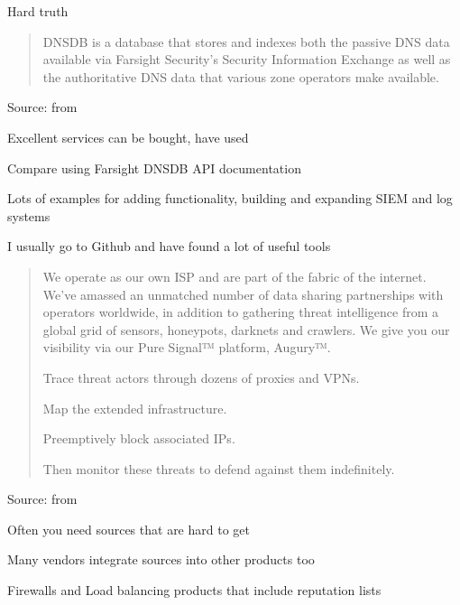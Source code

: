 \documentclass[Screen16to9,17pt]{foils}
\begin{document}
\begin{list2}
  \item Hard truth
\end{list2}



\begin{quote}
DNSDB is a database that stores and indexes both the passive DNS data available via Farsight Security’s Security Information Exchange as well as the authoritative DNS data that various zone operators make available.
\end{quote}
Source: from 
\begin{list2}
  \item Excellent services can be bought, have used 
\item Compare using 
  Farsight DNSDB API documentation
\item Lots of examples for adding functionality, building and expanding SIEM and log systems
\item I usually go to Github and have found a lot of useful tools
\end{list2}



\begin{quote}
  We operate as our own ISP and are part of the fabric of the internet. We’ve amassed an unmatched number of data sharing partnerships with operators worldwide, in addition to gathering threat intelligence from a global grid of sensors, honeypots, darknets and crawlers. We give you our visibility via our Pure Signal™ platform, Augury™.

\begin{list2}
\item Trace threat actors through dozens of proxies and VPNs.
\item Map the extended infrastructure.
\item Preemptively block associated IPs.
\item Then monitor these threats to defend against them indefinitely.
\end{list2}
\end{quote}
Source: from 

\begin{list2}
\item Often you need sources that are hard to get
\item Many vendors integrate sources into other products too
\item Firewalls and Load balancing products that include reputation lists
\end{list2}
\end{document}
